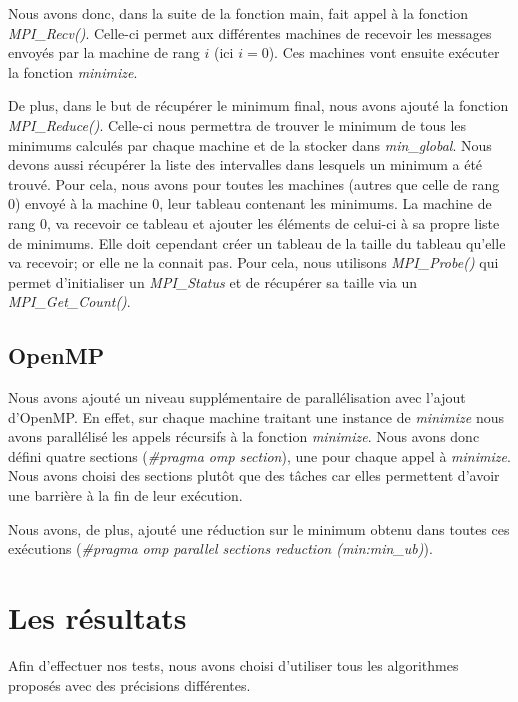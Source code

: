 \documentclass[a4paper,10pt]{article}
\begin{document}
Nous avons donc, dans la suite de la fonction main, fait appel à la fonction \emph{MPI\_Recv()}. Celle-ci permet aux différentes machines de recevoir les messages envoyés par la machine de rang $i$ (ici $i=0$). Ces machines vont ensuite exécuter la fonction \emph{minimize}. 

De plus, dans le but de récupérer le minimum final, nous avons ajouté la fonction \emph{MPI\_Reduce()}. Celle-ci nous permettra de trouver le minimum de tous les minimums calculés par chaque machine et de la stocker dans \emph{min\_global}.
Nous devons aussi récupérer la liste des intervalles dans lesquels un minimum a été trouvé. Pour cela, nous avons pour toutes les machines (autres que celle de rang 0) envoyé à la machine 0, leur tableau contenant les minimums. La machine de rang 0, va recevoir ce tableau et ajouter les éléments de celui-ci à sa propre liste de minimums. Elle doit cependant créer un tableau de la taille du tableau qu'elle va recevoir; or elle ne la connait pas. Pour cela, nous utilisons \emph{MPI\_Probe()} qui permet d'initialiser un \emph{MPI\_Status} et de récupérer sa taille via un \emph{MPI\_Get\_Count()}.

\subsection{OpenMP}
Nous avons ajouté un niveau supplémentaire de parallélisation avec l'ajout d'OpenMP. En effet, sur chaque machine traitant une instance de \emph{minimize} nous avons parallélisé les appels récursifs à la fonction \emph{minimize}. 
Nous avons donc défini quatre sections (\emph{\#pragma omp section}), une pour chaque appel à \emph{minimize}. Nous avons choisi des sections plutôt que des tâches car elles permettent d'avoir une barrière à la fin de leur exécution. 

Nous avons, de plus, ajouté une réduction sur le minimum obtenu dans toutes ces exécutions (\emph{\#pragma omp parallel sections reduction (min:min\_ub)}).


\newpage
\section{Les résultats}
Afin d'effectuer nos tests, nous avons choisi d'utiliser tous les algorithmes proposés avec des précisions différentes.
\end{document}
